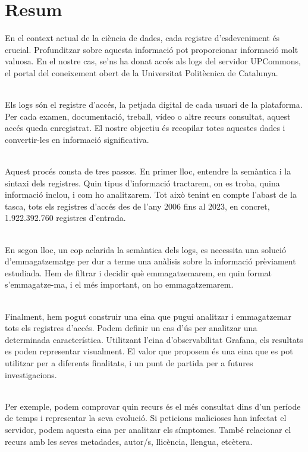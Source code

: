 \chapter*{Resum}\label{ch:abstract-ca}

En el context actual de la ciència de dades, cada registre d'esdeveniment és crucial.
Profunditzar sobre aquesta informació pot proporcionar informació molt valuosa.
En el nostre cas, se'ns ha donat accés als logs del servidor UPCommons, el portal del coneixement obert de la Universitat Politècnica de Catalunya.

\noindent \\
Els logs són el registre d'accés, la petjada digital de cada usuari de la plataforma.
Per cada examen, documentació, treball, vídeo o altre recurs consultat, aquest accés queda enregistrat.
El nostre objectiu és recopilar totes aquestes dades i convertir-les en informació significativa.

\noindent \\
Aquest procés consta de tres passos.
En primer lloc, entendre la semàntica i la sintaxi dels registres.
Quin tipus d'informació tractarem, on es troba, quina informació inclou, i com ho analitzarem.
Tot això tenint en compte l'abast de la tasca, tots els registres d'accés des de l'any 2006 fins al 2023, en concret, 1.922.392.760 registres d'entrada.

\noindent \\
En segon lloc, un cop aclarida la semàntica dels logs, es necessita una solució d'emmagatzematge per dur a terme una anàlisis sobre la informació prèviament estudiada.
Hem de filtrar i decidir què emmagatzemarem, en quin format s'emmagatze-ma, i el més important, on ho emmagatzemarem.

\noindent \\
Finalment, hem pogut construir una eina que pugui analitzar i emmagatzemar tots els registres d'accés.
Podem definir un cas d'ús per analitzar una determinada característica.
Utilitzant l'eina d'observabilitat Grafana, els resultats es poden representar visualment.
El valor que proposem és una eina que es pot utilitzar per a diferents finalitats, i un punt de partida per a futures investigacions.

\noindent \\
Per exemple, podem comprovar quin recurs és el més consultat dins d'un període de temps i representar la seva evolució.
Si peticions malicioses han infectat el servidor, podem aquesta eina per analitzar els símptomes.
També relacionar el recurs amb les seves metadades, autor/s, llicència, llengua, etcètera.

